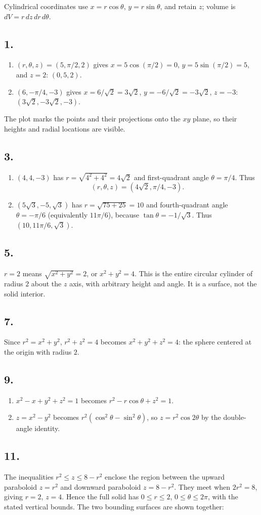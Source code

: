 \documentclass[11pt]{article}
\newcommand{\ex}[1]{\subsection*{#1.}}
\newcommand{\ans}[1]{\boxed{#1}}
\begin{document}
\noindent Cylindrical coordinates use $x=r\cos\theta$, $y=r\sin\theta$, and retain $z$; volume is $dV=r\,dz\,dr\,d\theta$.
\ex{1}
\begin{enumerate}[label=(\alph*)]
\item $(r,\theta,z)=(5,\pi/2,2)$ gives $x=5\cos(\pi/2)=0$, $y=5\sin(\pi/2)=5$, and $z=2$: $\ans{(0,5,2)}$.
\item $(6,-\pi/4,-3)$ gives $x=6/\sqrt2=3\sqrt2$, $y=-6/\sqrt2=-3\sqrt2$, $z=-3$: $\ans{(3\sqrt2,-3\sqrt2,-3)}$.
\end{enumerate}
The plot marks the points and their projections onto the $xy$ plane, so their heights and radial locations are visible.
\begin{center}\end{center}
\ex{3}
\begin{enumerate}[label=(\alph*)]
\item $(4,4,-3)$ has $r=\sqrt{4^2+4^2}=4\sqrt2$ and first-quadrant angle $\theta=\pi/4$. Thus
\[\ans{(r,\theta,z)=(4\sqrt2,\pi/4,-3)}.\]
\item $(5\sqrt3,-5,\sqrt3)$ has $r=\sqrt{75+25}=10$ and fourth-quadrant angle $\theta=-\pi/6$ (equivalently $11\pi/6$), because $\tan\theta=-1/\sqrt3$. Thus $\ans{(10,11\pi/6,\sqrt3)}$.
\end{enumerate}
\ex{5}
$r=2$ means $\sqrt{x^2+y^2}=2$, or $\ans{x^2+y^2=4}$. This is the entire circular cylinder of radius $2$ about the $z$ axis, with arbitrary height and angle. It is a surface, not the solid interior.
\ex{7}
Since $r^2=x^2+y^2$, $r^2+z^2=4$ becomes $\ans{x^2+y^2+z^2=4}$: the sphere centered at the origin with radius $2$.
\ex{9}
\begin{enumerate}[label=(\alph*)]
\item $x^2-x+y^2+z^2=1$ becomes $\ans{r^2-r\cos\theta+z^2=1}$.
\item $z=x^2-y^2$ becomes $r^2(\cos^2\theta-\sin^2\theta)$, so $\ans{z=r^2\cos2\theta}$ by the double-angle identity.
\end{enumerate}
\ex{11}
The inequalities $r^2\le z\le8-r^2$ enclose the region between the upward paraboloid $z=r^2$ and downward paraboloid $z=8-r^2$. They meet when $2r^2=8$, giving $r=2$, $z=4$. Hence the full solid has $0\le r\le2$, $0\le\theta\le2\pi$, with the stated vertical bounds. The two bounding surfaces are shown together:
\end{document}
